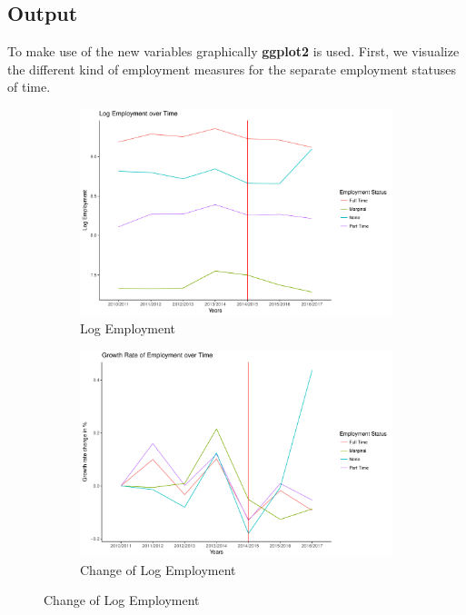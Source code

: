 \documentclass[a4paper]{article}
\begin{document}
\subsection{Output}
To make use of the new variables graphically \textbf{ggplot2} is used. First, we visualize the different kind of employment measures for the separate employment statuses of time.
%
\begin{figure}
\caption{Employment measures}
\begin{subfigure}[h]{0.5\linewidth}
\includegraphics[width=\textwidth]{q4/yearlog.pdf}
\caption{Log Employment}
\end{subfigure}
\hfill
\begin{subfigure}[h]{0.5\linewidth}
\includegraphics[width=\textwidth]{q4/yearchangelog.pdf}
\caption{Change of Log Employment}
\end{subfigure}


\end{figure}
\end{document}
